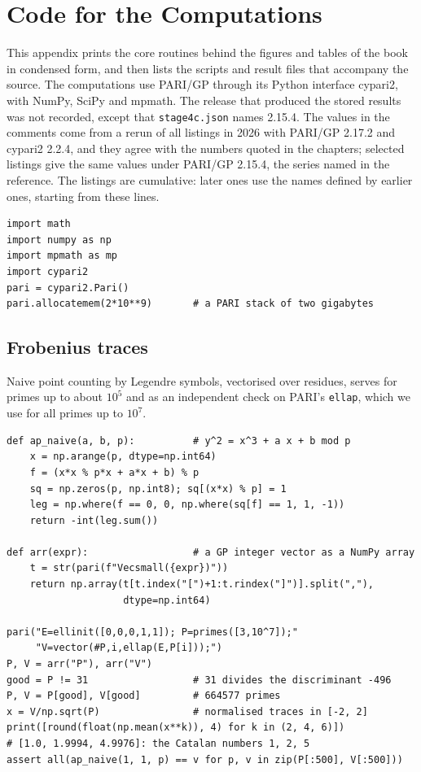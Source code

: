 \chapter{Code for the Computations}\label{app:B}

This appendix prints the core routines behind the figures and tables of the book in condensed form, and then lists the scripts and result files that accompany the source. The computations use PARI/GP \cite{pari2023} through its Python interface cypari2, with NumPy, SciPy and mpmath. The release that produced the stored results was not recorded, except that \texttt{stage4c.json} names 2.15.4. The values in the comments come from a rerun of all listings in 2026 with PARI/GP 2.17.2 and cypari2 2.2.4, and they agree with the numbers quoted in the chapters; selected listings give the same values under PARI/GP 2.15.4, the series named in the reference. The listings are cumulative: later ones use the names defined by earlier ones, starting from these lines.

{\footnotesize
\begin{verbatim}
import math
import numpy as np
import mpmath as mp
import cypari2
pari = cypari2.Pari()
pari.allocatemem(2*10**9)       # a PARI stack of two gigabytes
\end{verbatim}
}

\section{Frobenius traces}

Naive point counting by Legendre symbols, vectorised over residues, serves for primes up to about $10^5$ and as an independent check on PARI's \texttt{ellap}, which we use for all primes up to $10^7$.

{\footnotesize
\begin{verbatim}
def ap_naive(a, b, p):          # y^2 = x^3 + a x + b mod p
    x = np.arange(p, dtype=np.int64)
    f = (x*x % p*x + a*x + b) % p
    sq = np.zeros(p, np.int8); sq[(x*x) % p] = 1
    leg = np.where(f == 0, 0, np.where(sq[f] == 1, 1, -1))
    return -int(leg.sum())

def arr(expr):                  # a GP integer vector as a NumPy array
    t = str(pari(f"Vecsmall({expr})"))
    return np.array(t[t.index("[")+1:t.rindex("]")].split(","),
                    dtype=np.int64)

pari("E=ellinit([0,0,0,1,1]); P=primes([3,10^7]);"
     "V=vector(#P,i,ellap(E,P[i]));")
P, V = arr("P"), arr("V")
good = P != 31                  # 31 divides the discriminant -496
P, V = P[good], V[good]         # 664577 primes
x = V/np.sqrt(P)                # normalised traces in [-2, 2]
print([round(float(np.mean(x**k)), 4) for k in (2, 4, 6)])
# [1.0, 1.9994, 4.9976]: the Catalan numbers 1, 2, 5
assert all(ap_naive(1, 1, p) == v for p, v in zip(P[:500], V[:500]))
\end{verbatim}
}

